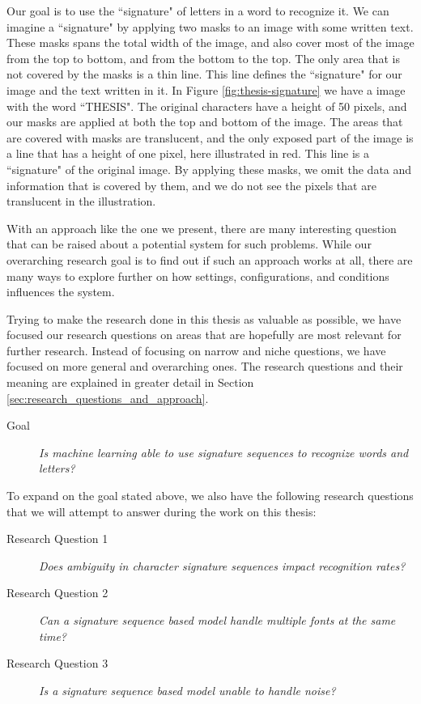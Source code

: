 Our goal is to use the ``signature" of letters in a word to recognize it. We can imagine a ``signature" by applying two masks to an image with some written text. These masks spans the total width of the image, and also cover most of the image from the top to bottom, and from the bottom to the top. The only area that is not covered by the masks is a thin line. This line defines the ``signature" for our image and the text written in it. In Figure \ref{fig:thesis-signature} we have a image with the word ``THESIS". The original characters have a height of 50 pixels, and our masks are applied at both the top and bottom of the image. The areas that are covered with masks are translucent, and the only exposed part of the image is a line that has a height of one pixel, here illustrated in red. This line is a ``signature" of the original image. By applying these masks, we omit the data and information that is covered by them, and we do not see the pixels that are translucent in the illustration.

With an approach like the one we present, there are many interesting question that can be raised about a potential system for such problems. While our overarching research goal is to find out if such an approach works at all, there are many ways to explore further on how settings, configurations, and conditions influences the system.

Trying to make the research done in this thesis as valuable as possible, we have focused our research questions on areas that are hopefully are most relevant for further research. Instead of focusing on narrow and niche questions, we have focused on more general and overarching ones. The research questions and their meaning are explained in greater detail in Section \ref{sec:research_questions_and_approach}.

\begin{description}
    \item[Goal]{\textit{Is machine learning able to use signature sequences to recognize words and letters?}}
\end{description}

To expand on the goal stated above, we also have the following research questions that we will attempt to answer during the work on this thesis:

\begin{description}
    \item[Research Question 1]{\textit{Does ambiguity in character signature sequences impact recognition rates?}}
    \item[Research Question 2]{\textit{Can a signature sequence based model handle multiple fonts at the same time?}}
    \item[Research Question 3]{\textit{Is a signature sequence based model unable to handle noise?}}
\end{description}

